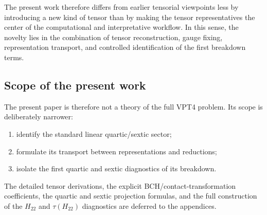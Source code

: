 The present work therefore differs from earlier tensorial viewpoints
less by introducing a new kind of tensor than by making the tensor
representatives the center of the computational and interpretative
workflow. In this sense, the novelty lies in the combination of
tensor reconstruction, gauge fixing, representation transport, and
controlled identification of the first breakdown terms.

\subsection{Scope of the present work}

The present paper is therefore not a theory of the full VPT4 problem.
Its scope is deliberately narrower:
\begin{enumerate}
\item identify the standard linear quartic/sextic sector;
\item formulate its transport between representations and reductions;
\item isolate the first quartic and sextic diagnostics of its breakdown.
\end{enumerate}

The detailed tensor derivations, the explicit BCH/contact-transformation
coefficients, the quartic and sextic projection formulas, and the full
construction of the $H_{22}$ and $\tau(H_{22})$ diagnostics are
deferred to the appendices.
